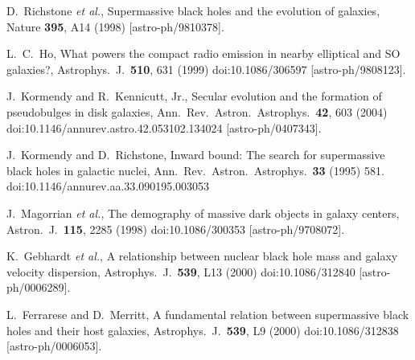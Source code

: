 \documentclass[aps,prd,twocolumn,superscriptaddress,tightenlines,nofootinbib]{revtex4-1}
\begin{document}
\begin{thebibliography}{99}
  D.~Richstone {\it et al.},
    {\color{rossoCP3} Supermassive black holes and the evolution of galaxies},
  Nature {\bf 395}, A14 (1998)
  [astro-ph/9810378].


  L.~C.~Ho,
    {\color{rossoCP3} What powers the compact radio emission in nearby elliptical and SO galaxies?},
  Astrophys.\ J.\  {\bf 510}, 631 (1999)
  doi:10.1086/306597
  [astro-ph/9808123].



  J.~Kormendy and R.~Kennicutt, Jr.,
     {\color{rossoCP3} Secular evolution and the formation of pseudobulges in disk galaxies},
  Ann.\ Rev.\ Astron.\ Astrophys.\  {\bf 42}, 603 (2004)
  doi:10.1146/annurev.astro.42.053102.134024
  [astro-ph/0407343].


  J.~Kormendy and D.~Richstone,
  {\color{rossoCP3} Inward bound: The search for supermassive black holes in galactic nuclei},
  Ann.\ Rev.\ Astron.\ Astrophys.\  {\bf 33} (1995) 581.
  doi:10.1146/annurev.aa.33.090195.003053


  J.~Magorrian {\it et al.},
 {\color{rossoCP3} The demography of massive dark objects in galaxy centers},
  Astron.\ J.\  {\bf 115}, 2285 (1998)
  doi:10.1086/300353
  [astro-ph/9708072].


  K.~Gebhardt {\it et al.},
  {\color{rossoCP3} A relationship between nuclear black hole mass and galaxy velocity dispersion},
  Astrophys.\ J.\  {\bf 539}, L13 (2000)
  doi:10.1086/312840
  [astro-ph/0006289].



  L.~Ferrarese and D.~Merritt,
  {\color{rossoCP3} A fundamental relation between supermassive black holes and their host galaxies},
  Astrophys.\ J.\  {\bf 539}, L9 (2000)
  doi:10.1086/312838
  [astro-ph/0006053].




\end{thebibliography}
\end{document}
